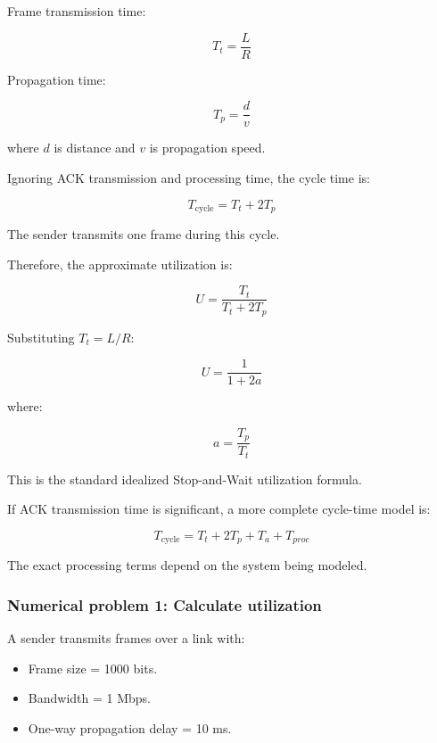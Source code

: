 Frame transmission time:



\[
\boxed{T_t=\frac{L}{R}}
\]



Propagation time:



\[
\boxed{T_p=\frac{d}{v}}
\]



where $d$ is distance and $v$ is propagation speed.

Ignoring ACK transmission and processing time, the cycle time is:



\[
T_{\text{cycle}}=T_t+2T_p
\]



The sender transmits one frame during this cycle.

Therefore, the approximate utilization is:



\[
\boxed{U=\frac{T_t}{T_t+2T_p}}
\]



Substituting $T_t=L/R$:



\[
\boxed{U=\frac{1}{1+2a}}
\]



where:



\[
a=\frac{T_p}{T_t}
\]



This is the standard idealized Stop-and-Wait utilization formula.

If ACK transmission time is significant, a more complete cycle-time model is:



\[
T_{\text{cycle}}=T_t+2T_p+T_a+T_{proc}
\]



The exact processing terms depend on the system being modeled.

\subsubsection{Numerical problem 1: Calculate utilization}

A sender transmits frames over a link with:

\begin{itemize}
\item Frame size = 1000 bits.
\item Bandwidth = 1 Mbps.
\item One-way propagation delay = 10 ms.
\end{itemize}

